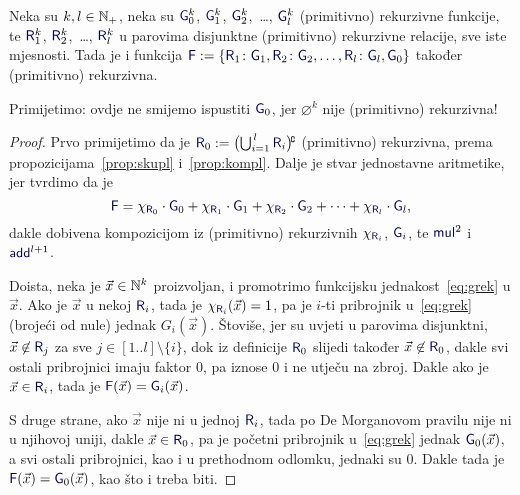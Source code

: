 \begin{teorem}\label{tm:grek}
Neka su $k,l\in{\mathbb N}_+$, neka su $\f G_0^k$, $\f G_1^k$, $\f G_2^k$,~\ldots, $\f G_l^k$ (primitivno) rekurzivne funkcije, te $\f R_1^k$, $\f R_2^k$,~\ldots, $\f R_l^k$ u parovima disjunktne (primitivno) rekurzivne relacije, sve iste mjesnosti. Tada je i funkcija $\f F:=\{\f R_1\colon\f G_1,\f R_2\colon\f G_2,\dotsc,\f R_l\colon\f G_l,\f G_0\}$ također (primitivno) rekurzivna.
\end{teorem}

Primijetimo: ovdje ne smijemo ispustiti $\f G_0$, jer $\varnothing^k$ nije (primitivno) rekurzivna!

\begin{proof}
Prvo primijetimo da je $\f R_0:=\bigl(\bigcup\nolimits_{i=1}^{\,l}\f R_i\bigr)\!\kompl$ (primitivno) rekurzivna, prema propozicijama~\ref{prop:skupl} i~\ref{prop:kompl}. Dalje je stvar jednostavne aritmetike, jer tvrdimo da je
\begin{equation}\label{eq:grek}
    \f F=\chi_{\f R_0}\cdot \f G_0+\chi_{\f R_1}\cdot \f G_1+\chi_{\f R_2}\cdot \f G_2+\dotsb+\chi_{\f R_l}\cdot\f G_l\text,
\end{equation}
dakle dobivena kompozicijom iz (primitivno) rekurzivnih $\chi_{\f R_i}$, $\f G_i$, te $\f{mul}^2$ i $\f{add}^{l+1}$.

    Doista, neka je $\vec x\in{\mathbb N}^k$ proizvoljan, i promotrimo funkcijsku jednakost~\eqref{eq:grek} u $\vec x$. Ako je $\vec x$ u nekoj $\f R_i$, tada je $\chi_{\f R_i}(\vec x)=1$, pa je $i$-ti pribrojnik u~\eqref{eq:grek} (brojeći od nule) jednak $G_i(\vec x)$. Štoviše, jer su uvjeti u parovima disjunktni, $\vec x\not\in\f R_j$ za sve $j\in[1..l]\setminus\{i\}$, dok iz definicije $\f R_0$ slijedi također $\vec x\not\in\f R_0$, dakle svi ostali pribrojnici imaju faktor $0$, pa iznose $0$ i ne utječu na zbroj. Dakle ako je $\vec x\in\f R_i$, tada je $\f F(\vec x)=\f G_i(\vec x)$.

S druge strane, ako $\vec x$ nije ni u jednoj $\f R_i$, tada po De Morganovom pravilu nije ni u njihovoj uniji, dakle $\vec x\in\f R_0$, pa je početni pribrojnik u~\eqref{eq:grek} jednak $\f G_0(\vec x)$, a svi ostali pribrojnici, kao i u prethodnom odlomku, jednaki su $0$. Dakle tada je $\f F(\vec x)=\f G_0(\vec x)$, kao što i treba biti.
\end{proof}

